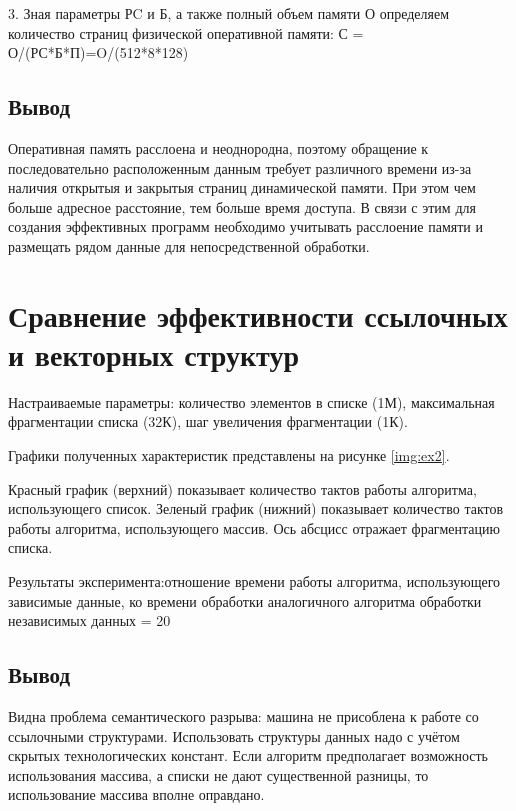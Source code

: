 3. Зная параметры РC и Б, а также полный объем памяти О определяем количество страниц физической оперативной памяти: С = О/(РС*Б*П)=O/(512*8*128)


\section*{Вывод}
 Оперативная память расслоена и неоднородна, поэтому обращение к последовательно расположенным данным требует различного времени из-за наличия открытыя и закрытыя  страниц динамической памяти. При этом чем больше адресное расстояние, тем больше время доступа. В связи с этим для создания эффективных программ необходимо учитывать расслоение памяти и размещать рядом данные для непосредственной обработки.



\chapter*{Сравнение эффективности ссылочных и векторных структур}

Настраиваемые параметры: количество элементов в списке (1М), максимальная фрагментации списка (32К), шаг увеличения фрагментации (1К).

Графики полученных характеристик представлены на рисунке \ref{img:ex2}.



Красный график (верхний) показывает количество тактов работы алгоритма, использующего список. Зеленый график (нижний) показывает количество тактов работы алгоритма, использующего массив. Ось абсцисс отражает фрагментацию списка. 



Результаты эксперимента:отношение времени работы алгоритма, использующего
зависимые данные, ко времени обработки аналогичного алгоритма обработки независимых
данных = 20


\section*{Вывод}
 Видна проблема семантического разрыва: машина не присоблена к работе со ссылочными структурами. Использовать структуры данных надо с учётом скрытых технологических констант. Если алгоритм предполагает возможность использования массива, а списки не дают существенной разницы, то использование массива вполне оправдано.



